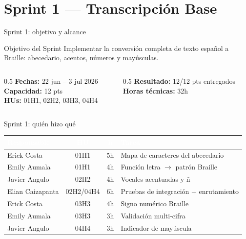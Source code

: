 \documentclass[11pt,aspectratio=169]{beamer}
\begin{document}
\section{Sprint 1 --- Transcripción Base}

\begin{frame}{Sprint 1: objetivo y alcance}
  \begin{block}{Objetivo del Sprint}
    Implementar la conversión completa de texto español a Braille: abecedario, acentos, números y
    mayúsculas.
  \end{block}
  \begin{columns}[T]
    \begin{column}{0.5\textwidth}
      \textbf{Fechas:} 22 jun -- 3 jul 2026\\
      \textbf{Capacidad:} 12 pts\\
      \textbf{HUs:} 01H1, 02H2, 03H3, 04H4
    \end{column}
    \begin{column}{0.5\textwidth}
      \textbf{Resultado:} 12/12 pts entregados\\
      \textbf{Horas técnicas:} 32h
    \end{column}
  \end{columns}
\end{frame}

\begin{frame}{Sprint 1: quién hizo qué}
  \scriptsize
  \renewcommand{\arraystretch}{1.3}
  \begin{tabular}{|l|c|c|p{5.8cm}|}
    \hline
    \rowcolor{epnblue}
    \textcolor{white}{Responsable} & \textcolor{white}{HU} & \textcolor{white}{h} & \textcolor{white}{Tarea} \\
    \hline
    Erick Costa & 01H1 & 5h & Mapa de caracteres del abecedario \\
    \rowcolor{epnrow} Emily Aumala & 01H1 & 4h & Función letra $\rightarrow$ patrón Braille \\
    Javier Angulo & 02H2 & 4h & Vocales acentuadas y ñ \\
    \rowcolor{epnrow} Elian Caizapanta & 02H2/04H4 & 6h & Pruebas de integración + enrutamiento \\
    Erick Costa & 03H3 & 4h & Signo numérico Braille \\
    \rowcolor{epnrow} Emily Aumala & 03H3 & 3h & Validación multi-cifra \\
    Javier Angulo & 04H4 & 3h & Indicador de mayúscula \\
    \hline
  \end{tabular}
\end{frame}
\end{document}
